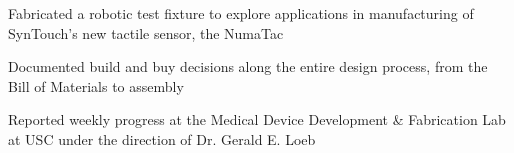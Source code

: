 \documentclass[letterpaper]{deedy-resume} %
\begin{document}
\begin{minipage}[t]{0.66\textwidth}
\begin{tightitemize}
\item Fabricated a robotic test fixture to explore applications in manufacturing of SynTouch's new tactile sensor, the NumaTac
\item Documented build and buy decisions along the entire design process, from the Bill of Materials to assembly
\item Reported weekly progress at the Medical Device Development \& Fabrication Lab at USC under the direction of Dr. Gerald E. Loeb 
\end{tightitemize}



\end{minipage} %








\end{document}
